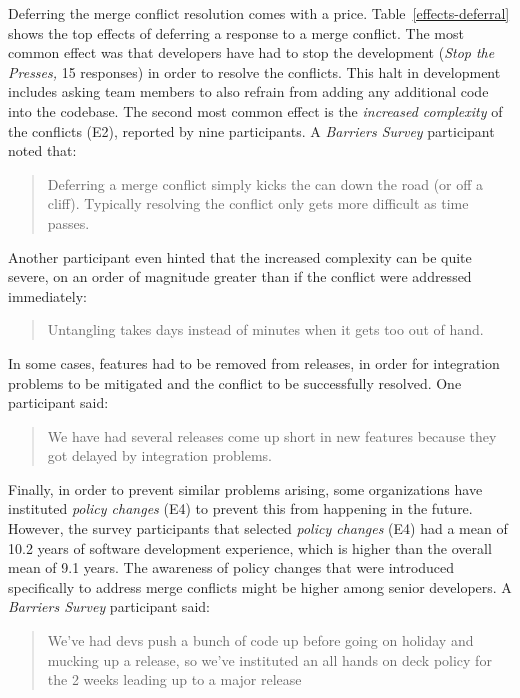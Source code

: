 Deferring the merge conflict resolution comes with a price.
Table~\ref{effects-deferral} shows the top effects of deferring a response to a merge conflict.
The most common effect was that developers have had to stop the development (\emph{Stop the Presses,} 15 responses) in order to resolve the conflicts.
This halt in development includes asking team members to also refrain from adding any additional code into the codebase.
The second most common effect is the \textit{increased complexity} of the conflicts (E2), reported by nine participants.
A \textit{Barriers Survey} participant noted that:
\begin{quotation}
	Deferring a merge conflict simply kicks the can down the road (or off a cliff). Typically resolving the conflict only gets more difficult as time passes.
\end{quotation}
Another participant even hinted that the increased complexity can be quite severe, on an order of magnitude greater than if the conflict were addressed immediately:
\begin{quotation}
	Untangling takes days instead of minutes when it gets too out of hand.
\end{quotation}
In some cases, features had to be removed from releases, in order for integration problems to be mitigated and the conflict to be successfully resolved. One participant said:
\begin{quotation}
	We have had several releases come up short in new features because they got delayed by integration problems.
\end{quotation}
Finally, in order to prevent similar problems arising, some organizations have instituted \textit{policy changes} (E4) to prevent this from happening in the future.
However, the survey participants that selected \textit{policy changes} (E4) had a mean of 10.2 years of software development experience, which is higher than the overall mean of 9.1 years.
The awareness of policy changes that were introduced specifically to address merge conflicts might be higher among senior developers.
A \textit{Barriers Survey} participant said:
\begin{quotation}
	We've had devs push a bunch of code up before going on holiday and mucking up a release, so we've instituted an all hands on deck policy for the 2 weeks leading up to a major release
\end{quotation}

